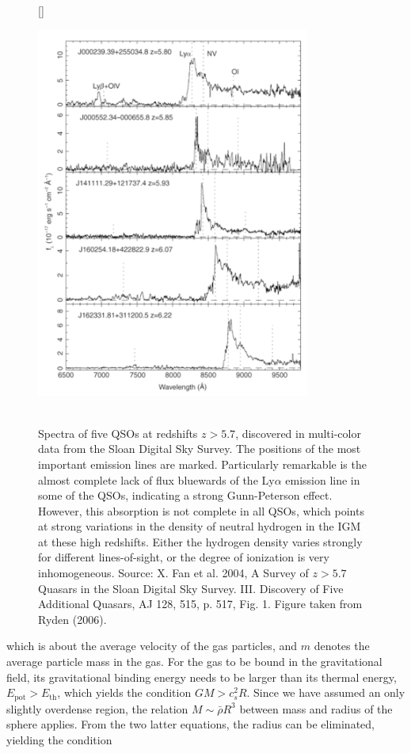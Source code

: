 \documentclass[a4paper,11pt]{article}
\begin{document}
\begin{figure}[t]
    [\FBwidth]
    {\caption{\footnotesize{\\Spectra of five QSOs at redshifts $z>5.7$, discovered in multi-color data from the Sloan Digital Sky Survey. The positions of the most important emission lines are marked. Particularly remarkable is the almost complete lack of flux bluewards of the Ly$\alpha$ emission line in some of the QSOs, indicating a strong Gunn-Peterson effect. However, this absorption is not complete in all QSOs, which points at strong variations in the density of neutral hydrogen in the IGM at these high redshifts. Either the hydrogen density varies strongly for different lines-of-sight, or the degree of ionization is very inhomogeneous. Source: X. Fan et al. 2004, A Survey of $z>5.7$ Quasars in the Sloan Digital Sky Survey. III. Discovery of Five Additional Quasars, AJ 128, 515, p. 517, Fig. 1. Figure taken from Ryden (2006).}}
    \label{fig:qsoabsorption}}
    {\includegraphics[width=9cm]{figures/QSOabsorption.png}}
\end{figure}

{\noindent}which is about the average velocity of the gas particles, and $m$ denotes the average particle mass in the gas. For the gas to be bound in the gravitational field, its gravitational binding energy needs to be larger than its thermal energy, $E_\mathrm{pot}>E_\mathrm{th}$, which yields the condition $GM>c_s^2R$. Since we have assumed an only slightly overdense region, the relation $M\sim\bar{\rho}R^3$ between mass and radius of the sphere applies. From the two latter equations, the radius can be eliminated, yielding the condition
\end{document}
